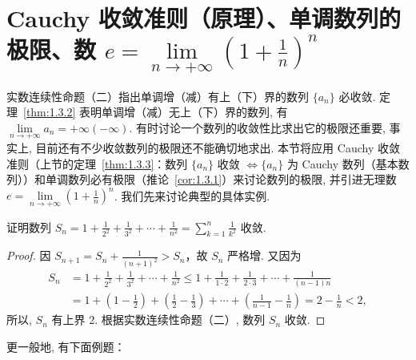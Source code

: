 \section{\texorpdfstring{Cauchy 收敛准则（原理）、单调数列的极限、数 $e = \lim\limits_{n \to +\infty} \left(1 + \frac{1}{n}\right)^n$}{Cauchy 收敛准则 (原理)、单调数列的极限、数 e}}\label{sec:1.4}

实数连续性命题（二）指出单调增（减）有上（下）界的数列 $\{a_{n}\}$ 必收敛. 定理~\ref{thm:1.3.2} 表明单调增（减）无上（下）界的数列, 有 $\lim\limits_{n\to+\infty} a_{n} = +\infty(-\infty)$. 有时讨论一个数列的收敛性比求出它的极限还重要, 事实上, 目前还有不少收敛数列的极限还不能确切地求出. 本节将应用 Cauchy 收敛准则（上节的定理~\ref{thm:1.3.3}：数列 $\{a_{n}\}$ 收敛 $\iff \{a_{n}\}$ 为 Cauchy 数列（基本数列））和单调数列必有极限（推论~\ref{cor:1.3.1}）来讨论数列的极限, 并引进无理数 $e = \lim\limits_{n \to +\infty} \left(1 + \frac{1}{n}\right)^{n}$. 我们先来讨论典型的具体实例.

\begin{example}\label{ex:1.4.1}
证明数列 $S_{n} = 1 + \frac{1}{2^{2}} + \frac{1}{3^{2}} + \cdots + \frac{1}{n^{2}} = \sum\limits_{k=1}^{n}\frac{1}{k^{2}}$ 收敛.
\end{example}

\begin{proof}
因 $S_{n+1} = S_{n} + \frac{1}{(n+1)^2} > S_{n}$，故 $S_{n}$ 严格增. 又因为
\[
\begin{aligned}
S_{n} &= 1 + \frac{1}{2^{2}} + \frac{1}{3^{2}} + \cdots + \frac{1}{n^{2}} \leqslant 1 + \frac{1}{1\cdot2} + \frac{1}{2\cdot3} + \cdots + \frac{1}{(n-1)n} \\
&= 1 + \left(1 - \frac{1}{2}\right) + \left(\frac{1}{2} - \frac{1}{3}\right) + \cdots + \left(\frac{1}{n-1} - \frac{1}{n}\right) = 2 - \frac{1}{n} < 2,
\end{aligned}
\]
所以, $S_{n}$ 有上界 2. 根据实数连续性命题（二）, 数列 $S_{n}$ 收敛.
\end{proof}

更一般地, 有下面例题：

